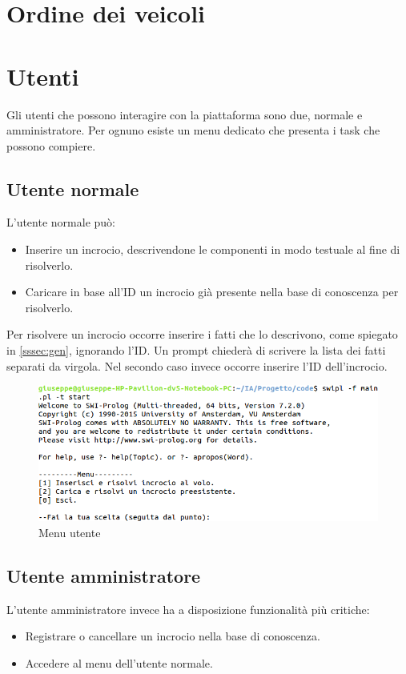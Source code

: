 \restoregeometry

\section{Ordine dei veicoli}

\section{Utenti}
\label{sec:users}
Gli utenti che possono interagire con la piattaforma sono due, normale e amministratore. Per ognuno esiste un menu dedicato che presenta i task che possono compiere.

\subsection{Utente normale}
L'utente normale può:
\begin{itemize}
	\item Inserire un incrocio, descrivendone le componenti in modo testuale al fine di risolverlo.
	\item Caricare in base all'ID un incrocio già presente nella base di conoscenza per risolverlo.
\end{itemize}

Per risolvere un incrocio occorre inserire i fatti che lo descrivono, come spiegato in \ref{sssec:gen}, ignorando l'ID. Un prompt chiederà di scrivere la lista dei fatti separati da virgola. Nel secondo caso invece occorre inserire l'ID dell'incrocio.

\begin{figure}[!hbtp]
	\includegraphics[width=\textwidth]{images/user}
	\caption{Menu utente}
\end{figure}


\subsection{Utente amministratore}
L'utente amministratore invece ha a disposizione funzionalità più critiche:
\begin{itemize}
	\item Registrare o cancellare un incrocio nella base di conoscenza.
	\item Accedere al menu dell'utente normale.
\end{itemize}

